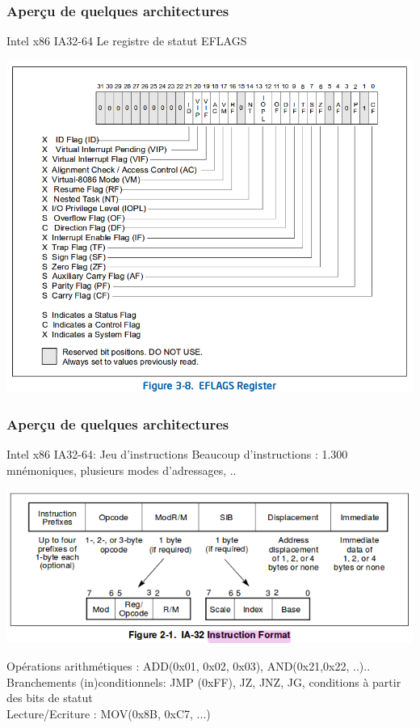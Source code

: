 \documentclass{beamer}
\begin{document}
\begin{frame}
  \frametitle{Aperçu de quelques architectures}
  \begin{block}{Intel x86 IA32-64}
    Le registre de statut EFLAGS\\
    \begin{center}
      \includegraphics[width=0.7\columnwidth]{Figs/x86_eflags.png}
    \end{center}    
  \end{block}
\end{frame}
  

\begin{frame}
  \frametitle{Aperçu de quelques architectures}
  \begin{block}{Intel x86 IA32-64: Jeu d'instructions}
    Beaucoup d'instructions : 1.300 mnémoniques, plusieurs modes d'adressages, ..\\
    \begin{center}
      \includegraphics[width=0.6\columnwidth]{Figs/ia32_instructions.png}
    \end{center}
    Opérations arithmétiques : ADD(0x01, 0x02, 0x03), AND(0x21,0x22, ..)..\\
    Branchements (in)conditionnels: JMP (0xFF), JZ, JNZ, JG, conditions à partir des bits de statut\\
    Lecture/Ecriture : MOV(0x8B, 0xC7, ...)
  \end{block}
\end{frame}
\end{document}
